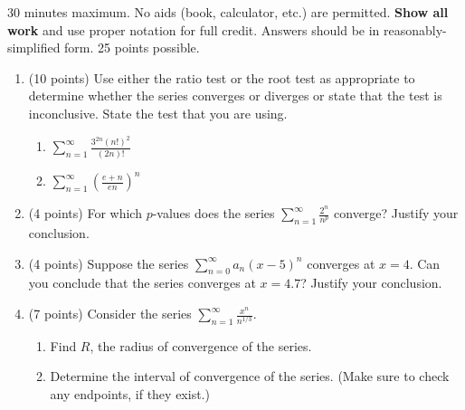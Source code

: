 \documentclass[12pt]{article}
\newcommand{\ds}{\displaystyle}
\begin{document}
30 minutes maximum.  No aids (book, calculator, etc.) are permitted.  \textbf{Show all work} and use proper notation for full credit.  Answers should be in reasonably-simplified form.  25 points possible.

\begin{enumerate}
\item (10 points) Use either the ratio test or the root test as appropriate to determine whether the series converges or diverges or state that the test is inconclusive. State the test that you are using.
	\begin{enumerate}
	\item $\ds \sum_{n=1}^{\infty} \frac{3^{2n}(n!)^2}{(2n)!}$
	\vfill
	\item $\ds \sum_{n=1}^{\infty} \left(\frac{e+n}{en}\right)^n$
	\vfill
	\end{enumerate}

\item (4 points) For which $p$-values does the series $\ds \sum_{n=1}^{\infty} \frac{2^n}{n^p}$ converge? Justify your conclusion.
\vfill
\newpage
\item (4 points) Suppose the series $\ds \sum_{n=0}^{\infty} a_n(x-5)^n$ converges at $x=4.$ Can you conclude that the series converges at $x=4.7$? Justify your conclusion.
\vfill
\item (7 points) Consider the series $\ds \sum_{n=1}^{\infty}\frac{x^n}{n^{1/3}}.$
	\begin{enumerate}
	\item Find $R$, the radius of convergence of the series.
	\vfill
	\item Determine the interval of convergence of the series. (Make sure to check any endpoints, if they exist.)
	\vfill
	\vfill
	\end{enumerate}
\end{enumerate}
\end{document}
